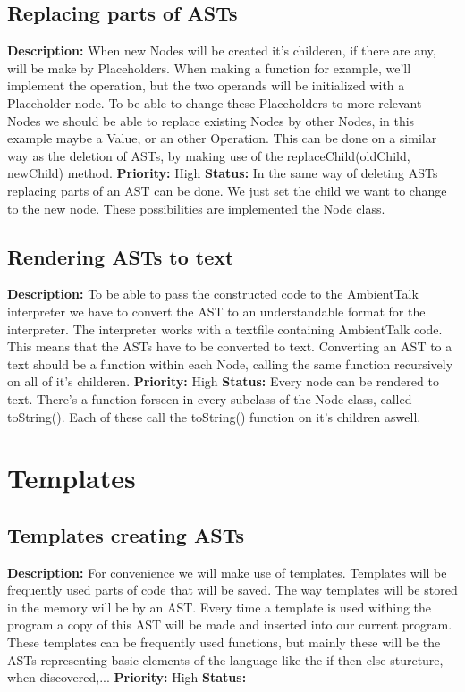 \documentclass[a4paper,12pt]{report}
\begin{document}
\subsection{Replacing parts of ASTs}
\textbf{Description: }When new Nodes will be created it's childeren, if there are any, will be make by Placeholders. When making a function for example, we'll implement the operation,
but the two operands will be initialized with a Placeholder node. To be able to change these Placeholders to more relevant Nodes we should be able to 
replace existing Nodes by other Nodes, in this example maybe a Value, or an other Operation. This can be done on a similar way as the deletion of ASTs, by making use of the replaceChild(oldChild, newChild) method.\newline
\textbf{Priority:} High \newline
\textbf{Status: } In the same way of deleting ASTs replacing parts of an AST can be done. We just set the child we want to change to the 
new node. These possibilities are implemented the Node class.\newline
\subsection{Rendering ASTs to text}
\textbf{Description: } To be able to pass the constructed code to the AmbientTalk interpreter we have to convert the AST to an understandable format for the interpreter. The 
interpreter works with a textfile containing AmbientTalk code. This means that the ASTs have to be converted to text. Converting an
AST to a text should be a function within each Node, calling the same function recursively on all of it's childeren.\newline
\textbf{Priority:} High \newline
\textbf{Status: } Every node can be rendered to text. There's a function forseen in every subclass of the Node class, called toString(). 
Each of these call the toString() function on it's children aswell.\newline
\section{Templates} 
\subsection{Templates creating ASTs}
\textbf{Description: } For convenience we will make use of templates. Templates will be frequently used parts of code that will be saved. The way templates will be stored in the 
memory will be by an AST. Every time a template is used withing the program a copy of this AST will be made and inserted into our current program.
These templates can be frequently used functions, but mainly these will be the ASTs representing basic elements of the language like the if-then-else sturcture, when-discovered,...\newline
\textbf{Priority:} High \newline
\textbf{Status: } \newline
\end{document}
